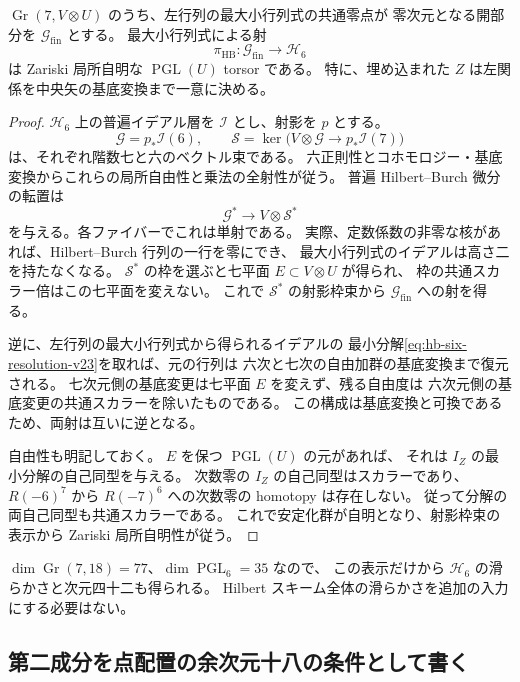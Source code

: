 \begin{proposition}
\label{prop:left-hilbert-torsor-v23}
$\operatorname{Gr}(7,V\otimes U)$ のうち、左行列の最大小行列式の共通零点が
零次元となる開部分を $\mathcal G_{\mathrm{fin}}$ とする。
最大小行列式による射
\[
 \pi_{\mathrm{HB}}:\mathcal G_{\mathrm{fin}}\longrightarrow\mathcal H_6
\]
は Zariski 局所自明な $\operatorname{PGL}(U)$ torsor である。
特に、埋め込まれた $Z$ は左関係を中央矢の基底変換まで一意に決める。
\end{proposition}
\begin{proof}
$\mathcal H_6$ 上の普遍イデアル層を $\mathcal I$ とし、射影を $p$ とする。
\[
 \mathscr G=p_*\mathcal I(6),\qquad
 \mathscr S=\ker\bigl(V\otimes\mathscr G\longrightarrow p_*\mathcal I(7)\bigr)
\]
は、それぞれ階数七と六のベクトル束である。
六正則性とコホモロジー・基底変換からこれらの局所自由性と乗法の全射性が従う。
普遍 Hilbert--Burch 微分の転置は
\[
 \mathscr G^*\longrightarrow V\otimes\mathscr S^*
\]
を与える。各ファイバーでこれは単射である。
実際、定数係数の非零な核があれば、Hilbert--Burch 行列の一行を零にでき、
最大小行列式のイデアルは高さ二を持たなくなる。
$\mathscr S^*$ の枠を選ぶと七平面 $E\subset V\otimes U$ が得られ、
枠の共通スカラー倍はこの七平面を変えない。
これで $\mathscr S^*$ の射影枠束から $\mathcal G_{\mathrm{fin}}$ への射を得る。

逆に、左行列の最大小行列式から得られるイデアルの
最小分解\eqref{eq:hb-six-resolution-v23}を取れば、元の行列は
六次と七次の自由加群の基底変換まで復元される。
七次元側の基底変更は七平面 $E$ を変えず、残る自由度は
六次元側の基底変更の共通スカラーを除いたものである。
この構成は基底変換と可換であるため、両射は互いに逆となる。

自由性も明記しておく。
$E$ を保つ $\operatorname{PGL}(U)$ の元があれば、
それは $I_Z$ の最小分解の自己同型を与える。
次数零の $I_Z$ の自己同型はスカラーであり、
$R(-6)^7$ から $R(-7)^6$ への次数零の homotopy は存在しない。
従って分解の両自己同型も共通スカラーである。
これで安定化群が自明となり、射影枠束の表示から Zariski 局所自明性が従う。
\end{proof}

\begin{remark}
$\dim\operatorname{Gr}(7,18)=77$、$\dim\operatorname{PGL}_6=35$ なので、
この表示だけから $\mathcal H_6$ の滑らかさと次元四十二も得られる。
Hilbert スキーム全体の滑らかさを追加の入力にする必要はない。
\end{remark}

\subsection{第二成分を点配置の余次元十八の条件として書く}

